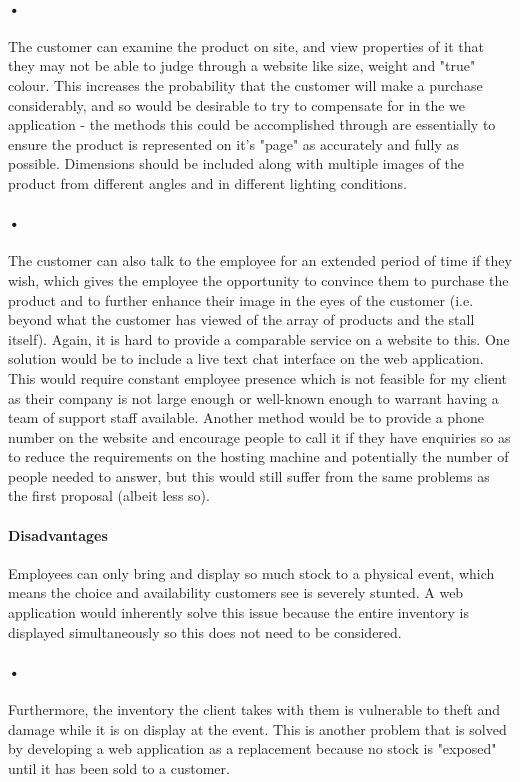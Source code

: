 \documentclass{article}
\begin{document}
    \paragraph{•}
    The customer can examine the product on site, and view properties of it that they may not be able to judge through a website like size, weight and "true" colour.
    This increases the probability that the customer will make a purchase considerably, and so would be desirable to try to compensate for in the we application - the methods this could be accomplished through are essentially to ensure the product is represented on it's "page" as accurately and fully as possible.
    Dimensions should be included along with multiple images of the product from different angles and in different lighting conditions.
    \paragraph{•}
    The customer can also talk to the employee for an extended period of time if they wish, which gives the employee the opportunity to convince them to purchase the product and to further enhance their image in the eyes of the customer (i.e. beyond what the customer has viewed of the array of products and the stall itself).
    Again, it is hard to provide a comparable service on a website to this.
    One solution would be to include a live text chat interface on the web application.
    This would require constant employee presence which is not feasible for my client as their company is not large enough or well-known enough to warrant having a team of support staff available.
    Another method would be to provide a phone number on the website and encourage people to call it if they have enquiries so as to reduce the requirements on the hosting machine and potentially the number of people needed to answer, but this would still suffer from the same problems as the first proposal (albeit less so).
    \paragraph{Disadvantages}
    Employees can only bring and display so much stock to a physical event, which means the choice and availability customers see is severely stunted.
    A web application would inherently solve this issue because the entire inventory is displayed simultaneously so this does not need to be considered.
    \paragraph{•}
    Furthermore, the inventory the client takes with them is vulnerable to theft and damage while it is on display at the event.
    This is another problem that is solved by developing a web application as a replacement because no stock is "exposed" until it has been sold to a customer.
\end{document}
